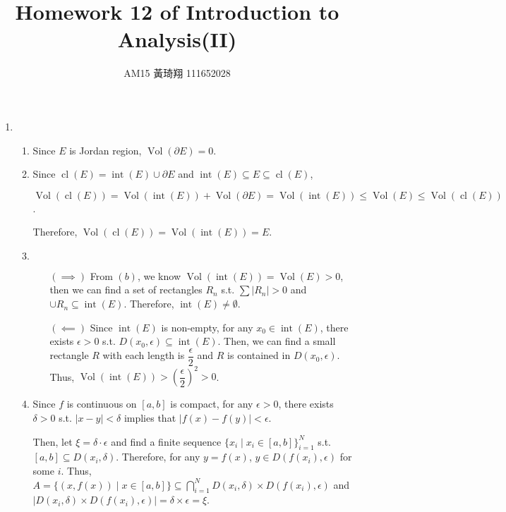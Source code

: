 \documentclass[12pt]{article}
\title{Homework 12 of Introduction to Analysis(II)}
\author{AM15 黃琦翔 111652028}
\DeclareMathOperator{\volumn}{Vol}
\DeclareMathOperator{\interior}{int}
\DeclareMathOperator{\closure}{cl}
\begin{document}
\maketitle
\begin{enumerate}
    \item \begin{enumerate}
        \item Since $E$ is Jordan region, $\volumn(\partial E) = 0$.

        \item Since $\closure(E) = \interior(E) \cup \partial E$ and $\interior(E)\subseteq E \subseteq \closure(E)$,

        $\volumn(\closure(E)) = \volumn(\interior(E)) + \volumn(\partial E) = \volumn(\interior(E))\leq \volumn(E) \leq \volumn(\closure(E))$.

        Therefore, $\volumn(\closure(E)) = \volumn(\interior(E)) = E$.

        \item $\ $
        \begin{enumerate}
            \item[$(\implies)$] From $(b)$, we know $\volumn(\interior(E)) = \volumn(E) > 0$, 
            then we can find a set of rectangles $R_n$ s.t. $\sum |R_n| > 0$ and $\cup R_n \subseteq \interior(E)$.
            Therefore, $\interior(E) \neq \emptyset$.

            \item[$(\impliedby)$] Since $\interior(E)$ is non-empty, for any $x_0\in \interior(E)$, there exists $\epsilon > 0$ s.t. $D(x_0, \epsilon) \subseteq \interior(E)$.
            Then, we can find a small rectangle $R$ with each length is $\dfrac{\epsilon}{2}$ and $R$ is contained in $D(x_0, \epsilon)$.
            Thus, $\volumn(\interior(E)) > \left(\dfrac{\epsilon}{2}\right)^2 > 0$.
        \end{enumerate}

        \item Since $f$ is continuous on $[a, b]$ is compact, for any $\epsilon > 0$, there exists $\delta > 0$ s.t. 
        $|x-y| < \delta$ implies that $|f(x) - f(y)|< \epsilon$.

        Then, let $\xi = \delta \cdot \epsilon$ and find a finite sequence $\{x_i \mid x_i \in [a, b]\}_{i=1}^N$ s.t. $[a, b] \subseteq D(x_i, \delta)$.
        Therefore, for any $y = f(x)$, $y \in D(f(x_i), \epsilon)$ for some $i$.
        Thus, $A = \{(x, f(x)) \mid x\in [a, b]\} \subseteq \displaystyle\bigcap_{i=1}^N D(x_i, \delta)\times D(f(x_i), \epsilon)$ and $|D(x_i, \delta) \times D(f(x_i), \epsilon)| = \delta \times \epsilon = \xi$.
    \end{enumerate}
\end{enumerate}
\end{document}
